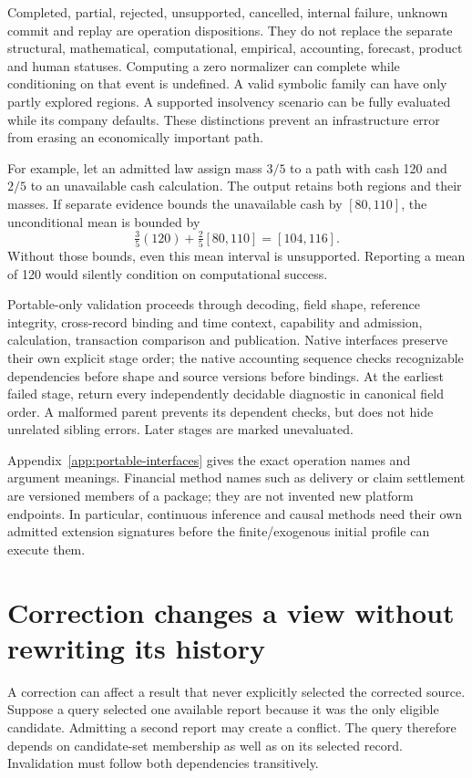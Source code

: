 Completed, partial, rejected, unsupported, cancelled, internal failure, unknown
commit and replay are operation dispositions. They do not replace the separate
structural, mathematical, computational, empirical, accounting, forecast,
product and human statuses. Computing a zero normalizer can complete while
conditioning on that event is undefined. A valid symbolic family can have only
partly explored regions. A supported insolvency scenario can be fully evaluated
while its company defaults. These distinctions prevent an infrastructure error
from erasing an economically important path.

For example, let an admitted law assign mass $3/5$ to a path with cash 120 and
$2/5$ to an unavailable cash calculation. The output retains both regions and
their masses. If separate evidence bounds the unavailable cash by $[80,110]$,
the unconditional mean is bounded by
\[
  \tfrac35(120)+\tfrac25[80,110]=[104,116].
\]
Without those bounds, even this mean interval is unsupported. Reporting a mean
of 120 would silently condition on computational success.

Portable-only validation proceeds through decoding, field shape, reference
integrity, cross-record binding and time context, capability and admission,
calculation, transaction comparison and publication. Native interfaces preserve
their own explicit stage order; the native accounting sequence checks
recognizable dependencies before shape and source versions before bindings.
At the earliest failed stage, return every independently decidable diagnostic
in canonical field order. A malformed parent prevents its dependent checks,
but does not hide unrelated sibling errors. Later stages are marked unevaluated.

Appendix~\ref{app:portable-interfaces} gives the exact operation names and
argument meanings. Financial method names such as delivery or claim settlement
are versioned members of a package; they are not invented new platform
endpoints. In particular, continuous inference and causal methods need their
own admitted extension signatures before the finite/exogenous initial profile
can execute them.

\section{Correction changes a view without rewriting its history}

A correction can affect a result that never explicitly selected the corrected
source. Suppose a query selected one available report because it was the only
eligible candidate. Admitting a second report may create a conflict. The query
therefore depends on candidate-set membership as well as on its selected
record. Invalidation must follow both dependencies transitively.

